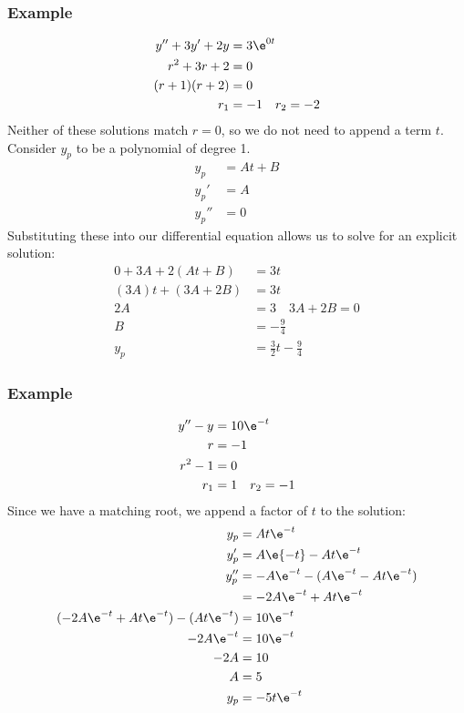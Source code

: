 \documentclass{math}
\begin{document}
\subsubsection*{Example}
\begin{align*}
  y''+3y'+2y &= 3\e^{0t} \\
  r^2+3r+2 &= 0 \\
  (r+1)(r+2) &= 0 \\
  r_1 &= -1 \quad r_2 = -2
\end{align*}
Neither of these solutions match \( r = 0 \), so we do not need to append a term
\( t \). Consider \( y_p \) to be a polynomial of degree 1.
\begin{align*}
  y_p &= At+B \\
  y_p' &= A \\
  y_p'' &= 0
\end{align*}
Substituting these into our differential equation allows us to solve for an
explicit solution:
\begin{align*}
  0+3A+2(At+B) &= 3t \\
  (3A)t+(3A+2B) &= 3t \\
  2A &= 3 \quad 3A+2B = 0 \\
  B &= -\frac{9}{4} \\
  y_p &= \frac{3}{2}t-\frac{9}{4}
\end{align*}

\subsubsection*{Example}
\begin{align*}
  y''-y &= 10\e^{-t} \\
  r &= -1 \\
  r^2-1 &= 0 \\
  r_1 &= 1 \quad r_2 = -1
\end{align*}
Since we have a matching root, we append a factor of \( t \) to the solution:
\begin{align*}
  y_p &= At\e^{-t} \\
  y_p' &= A\e{-t}-At\e^{-t} \\
  y_p'' &= -A\e^{-t}-(A\e^{-t}-At\e^{-t}) \\
  &= -2A\e^{-t}+At\e^{-t} \\
  (-2A\e^{-t}+At\e^{-t})-(At\e^{-t}) &= 10\e^{-t} \\
  -2A\e^{-t} &= 10\e^{-t} \\
  -2A &= 10 \\
  A &= 5 \\
  y_p &= -5t\e^{-t}
\end{align*}
\end{document}
